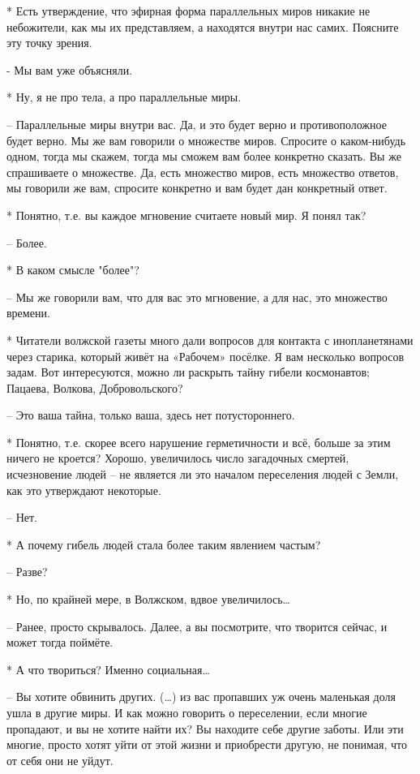 * Есть утверждение, что эфирная форма параллельных миров никакие не небожители, как мы их представляем, а находятся внутри нас самих. Поясните эту точку зрения.

 - Мы вам уже объясняли.

 * Ну, я не про тела, а про параллельные миры.

 – Параллельные миры внутри вас. Да, и это будет верно и противоположное будет верно. Мы же вам говорили о множестве миров. Спросите о каком-нибудь одном, тогда мы скажем, тогда мы сможем вам более конкретно сказать. Вы же спрашиваете о множестве. Да, есть множество миров, есть множество ответов, мы говорили же вам, спросите конкретно и вам будет дан конкретный ответ.

 * Понятно, т.е. вы каждое мгновение считаете новый мир. Я понял так?

 – Более.

 * В каком смысле "более"?

 – Мы же говорили вам, что для вас это мгновение, а для нас, это множество времени.

 * Читатели волжской газеты много дали вопросов для контакта с инопланетянами через старика, который живёт на «Рабочем» посёлке. Я вам несколько вопросов задам. Вот интересуются, можно ли раскрыть тайну гибели космонавтов; Пацаева, Волкова, Добровольского?

 – Это ваша тайна, только ваша, здесь нет потустороннего.

 * Понятно, т.е. скорее всего нарушение герметичности и всё, больше за этим ничего не кроется? Хорошо, увеличилось число загадочных смертей, исчезновение людей – не является ли это началом переселения людей с Земли, как это утверждают некоторые.

 – Нет.

 * А почему гибель людей стала более таким явлением частым?

 – Разве?

 * Но, по крайней мере, в Волжском, вдвое увеличилось…

 – Ранее, просто скрывалось. Далее, а вы посмотрите, что творится сейчас, и может тогда поймёте.

 * А что твориться? Именно социальная…

 – Вы хотите обвинить других. (…) из вас пропавших уж очень маленькая доля ушла в другие миры. И как можно говорить о переселении, если многие пропадают, и вы не хотите найти их? Вы находите себе другие заботы. Или эти многие, просто хотят уйти от этой жизни и приобрести другую, не понимая, что от себя они не уйдут.

